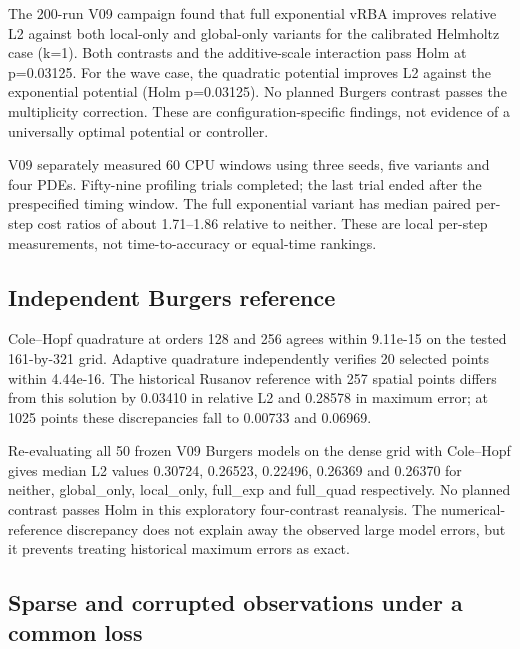 \documentclass[
  11pt,
]{article}
\begin{document}
The 200-run V09 campaign found that full exponential vRBA improves
relative L2 against both local-only and global-only variants for the
calibrated Helmholtz case (k=1). Both contrasts and the additive-scale
interaction pass Holm at p=0.03125. For the wave case, the quadratic
potential improves L2 against the exponential potential (Holm
p=0.03125). No planned Burgers contrast passes the multiplicity
correction. These are configuration-specific findings, not evidence of a
universally optimal potential or controller.

V09 separately measured 60 CPU windows using three seeds, five variants
and four PDEs. Fifty-nine profiling trials completed; the last trial
ended after the prespecified timing window. The full exponential variant
has median paired per-step cost ratios of about 1.71--1.86 relative to
neither. These are local per-step measurements, not time-to-accuracy or
equal-time rankings.

\hypertarget{independent-burgers-reference}{%
\subsection{Independent Burgers
reference}\label{independent-burgers-reference}}

Cole--Hopf quadrature at orders 128 and 256 agrees within 9.11e-15 on
the tested 161-by-321 grid. Adaptive quadrature independently verifies
20 selected points within 4.44e-16. The historical Rusanov reference
with 257 spatial points differs from this solution by 0.03410 in
relative L2 and 0.28578 in maximum error; at 1025 points these
discrepancies fall to 0.00733 and 0.06969.

Re-evaluating all 50 frozen V09 Burgers models on the dense grid with
Cole--Hopf gives median L2 values 0.30724, 0.26523, 0.22496, 0.26369 and
0.26370 for neither, global\_only, local\_only, full\_exp and full\_quad
respectively. No planned contrast passes Holm in this exploratory
four-contrast reanalysis. The numerical-reference discrepancy does not
explain away the observed large model errors, but it prevents treating
historical maximum errors as exact.

\hypertarget{sparse-and-corrupted-observations-under-a-common-loss}{%
\subsection{Sparse and corrupted observations under a common
loss}\label{sparse-and-corrupted-observations-under-a-common-loss}}
\end{document}
